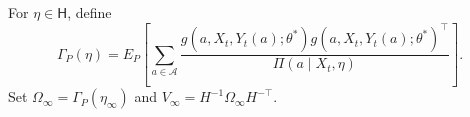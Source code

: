 For \(\eta\in\mathsf H\), define
\[
 \Gamma_P(\eta)=E_P\!\left[\sum_{a\in\mathcal A}
 \frac{g(a,X_t,Y_t(a);\theta^*)g(a,X_t,Y_t(a);\theta^*)^\top}
 {\Pi(a\mid X_t,\eta)}\right].
\]
Set \(\Omega_\infty=\Gamma_P(\eta_\infty)\) and \(V_\infty=H^{-1}\Omega_\infty H^{-\top}\).